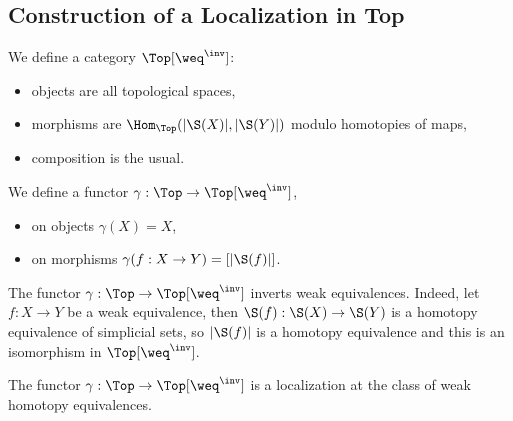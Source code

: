 \subsection{Construction of a Localization in Top}

We define a category $\Top[\weq^\inv]$:
\begin{itemize}[label={-}]
    \item objects are all topological spaces,
    \item morphisms are $\Hom_\Top(|\S(X)|,|\S(Y)|)$ modulo homotopies of maps,
    \item composition is the usual.
\end{itemize}

We define a functor $\gamma:\Top\to\Top[\weq^\inv]$,
\begin{itemize}[label={-}]
    \item on objects $\gamma(X)=X$,
    \item on morphisms $\gamma(f:X\to Y)=[|\S(f)|]$.
\end{itemize}

The functor $\gamma:\Top\to\Top[\weq^\inv]$ inverts weak equivalences. Indeed, let $f:X\to Y$ be a weak equivalence, then $\S(f):\S(X)\to\S(Y)$ is a homotopy equivalence of simplicial sets, so $|\S(f)|$ is a homotopy equivalence and this is an isomorphism in $\Top[\weq^\inv]$.

\begin{theorem}
The functor $\gamma:\Top\to\Top[\weq^\inv]$ is a localization at the class of weak homotopy equivalences.
\end{theorem}

